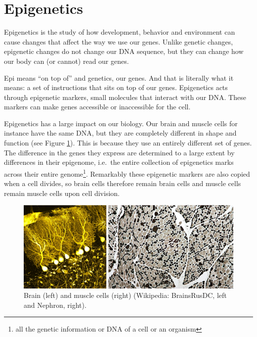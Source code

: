 \documentclass[
  11pt,
]{book}
\begin{document}
\hypertarget{epigenetics}{%
\section{Epigenetics}\label{epigenetics}}

Epigenetics is the study of how development, behavior and environment can cause changes that affect the way we use our genes. Unlike genetic changes, epigenetic changes do not change our DNA sequence, but they can change how our body can (or cannot) read our genes.

Epi means ``on top of'' and genetics, our genes. And that is literally what it means: a set of instructions that sits on top of our genes. Epigenetics acts through epigenetic markers, small molecules that interact with our DNA. These markers can make genes accessible or inaccessible for the cell.

Epigenetics has a large impact on our biology. Our brain and muscle cells for instance have the same DNA, but they are completely different in shape and function (see Figure \ref{fig:brainMuscle}). This is because they use an entirely different set of genes. The difference in the genes they express are determined to a large extent by differences in their epigenome, i.e.~the entire collection of epigenetics marks across their entire genome\footnote{all the genetic information or DNA of a cell or an organism}. Remarkably these epigenetic markers are also copied when a cell divides, so brain cells therefore remain brain cells and muscle cells remain muscle cells upon cell division.

\begin{figure}

{\centering \includegraphics[width=0.9\linewidth]{./figs/brainMuscleCells} 

}

\caption{Brain (left) and muscle cells (right) (Wikipedia: BrainsRusDC, left and Nephron, right).}\label{fig:brainMuscle}
\end{figure}
\end{document}
